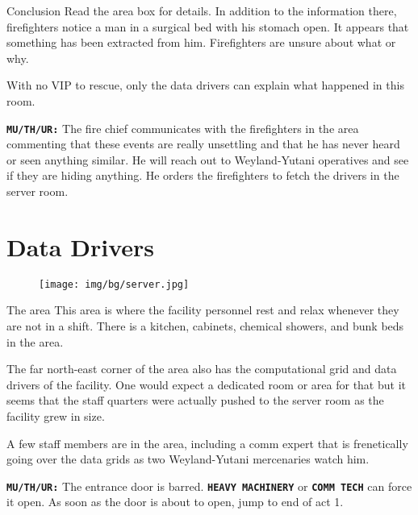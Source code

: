 \newsect


\begin{rpg-commentbox}{Conclusion}
    Read the area box for details. In addition to the information there, firefighters notice a man in a surgical bed with his stomach open. It appears that something has been extracted from him. Firefighters are unsure about what or why. 

    With no VIP to rescue, only the data drivers can explain what happened in this room.
    
    \texttt{\textbf{MU/TH/UR:}} The fire chief communicates with the firefighters in the area commenting that these events are really unsettling and that he has never heard or seen anything similar. He will reach out to Weyland-Yutani operatives and see if they are hiding anything. He orders the firefighters to fetch the drivers in the server room.
\end{rpg-commentbox}  

%


\clearpage

\section{Data Drivers}


\begin{figure}[!b]
    \centering
    \texttt{[image: img/bg/server.jpg]}
\end{figure}


\begin{rpg-commentbox}{The area}
    This area is where the facility personnel rest and relax whenever they are not in a shift. There is a kitchen, cabinets, chemical showers, and bunk beds in the area. 
    
    The far north-east corner of the area also has the computational grid and data drivers of the facility. One would expect a dedicated room or area for that but it seems that the staff quarters were actually pushed to the server room as the facility grew in size. 

    A few staff members are in the area, including a comm expert that is frenetically going over the data grids as two Weyland-Yutani mercenaries watch him. 

    \texttt{\textbf{MU/TH/UR:}} The entrance door is barred. \texttt{\textbf{HEAVY MACHINERY}} or \texttt{\textbf{COMM TECH}} can force it open. As soon as the door is about to open, jump to end of act 1.
\end{rpg-commentbox}  


